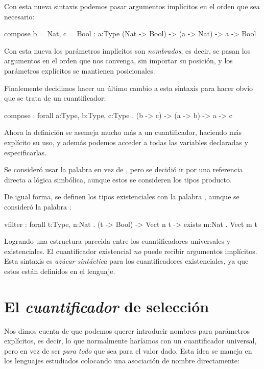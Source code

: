 {\begin{designfr}
Con esta nueva sintaxis podemos pasar argumentos implícitos en el orden que sea necesario:

\begin{anglercode}
compose { b = Nat, c = Bool } : { a:Type } (Nat -> Bool) -> (a -> Nat) -> a -> Bool
\end{anglercode}

Con esta nueva los parámetros implícitos son \emph{nombrados}, es decir, se pasan los argumentos en el orden que nos convenga, sin importar su posición, y los parámetros explícitos se mantienen posicionales.

Finalemente decidimos hacer un último cambio a esta sintaxis para hacer obvio que se trata de un cuantificador:

\begin{anglercode}
compose : forall a:Type, b:Type, c:Type . (b -> c) -> (a -> b) -> a -> c
\end{anglercode}

Ahora la definición se asemeja mucho más a un cuantificador, haciendo más explícito su uso, y además podemos acceder a todas las variables declaradas y especificarlas.

Se consideró usar la palabra  en vez de , pero se decidió ir por una referencia directa a lógica simbólica, aunque estos se consideren los tipos producto.

De igual forma, se definen los tipos existenciales con la palabra , aunque se consideró la palabra :

\begin{anglercode}
vfilter : forall t:Type, n:Nat . (t -> Bool) -> Vect n t -> exists m:Nat . Vect m t
\end{anglercode}

Logrando una estructura parecida entre los cuantificadores universales y existenciales. El cuantificador existencial \emph{no} puede recibir argumentos implícitos. Esta sintaxis es \emph{azúcar sintáctica} para los cuantificadores existenciales, ya que estos están definidos en el lenguaje.
\end{designfr}

\section{El \emph{cuantificador} de selección}

\begin{designfr}
Nos dimos cuenta de que podemos querer introducir nombres para parámetros explícitos, es decir, lo que normalmente haríamos con un cuantificador universal, pero en vez de ser \emph{para todo} que sea para el valor dado. Esta idea se maneja en los lenguajes estudiados colocando una asociación de nombre directamente:


\end{designfr}}
